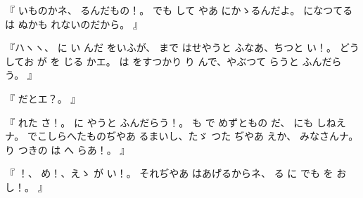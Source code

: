 『
いものかネ、
るんだもの！。
でも
して
やあ
にかゝるんだよ。
になつてる
は
ぬかも
れないのだから。
』

『ハヽヽ、
に
い
んだ
をいふが、
まで
はせやうと
ふなあ、ちつと
い！。
どうしてお
が
を
じる
かエ。
は
をすつかり
り
んで、やぶつて
らうと
ふんだらう。
』

『
だとエ？。
』

『
れた
さ！。
に
やうと
ふんだらう！。
も
で
めずともの
だ、
にも
しねえナ。
でこしらへたものぢやあ
るまいし、たゞ
つた
ぢやあ
えか、
みなさんナ。
り
つきの
は
へ
らあ！。
』

『
！、
め！、えゝ
が
い！。
それぢやあ
はあげるからネ、
る
に
でも
を
お
し！。
』

